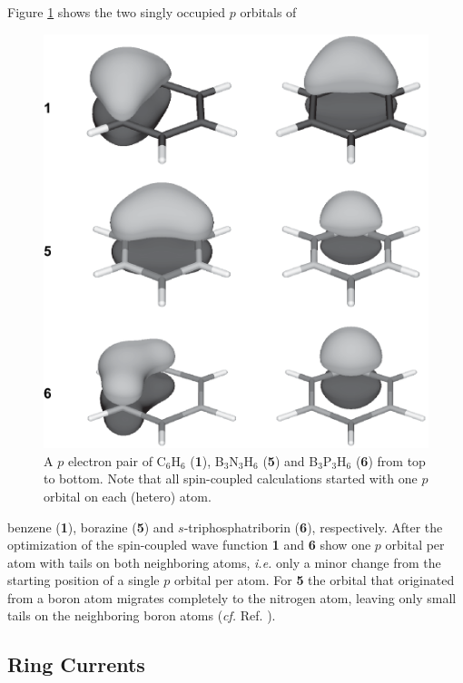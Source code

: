 Figure \ref{ch6.figure2} shows the two singly occupied $p$ orbitals of
\begin{figure}[htbp]
\center
\includegraphics[scale=0.7]{inorganic/figures/figure2.eps}
\caption{A $p$ electron pair of C$_6$H$_6$ (\textbf{1}), B$_3$N$_3$H$_6$ (\textbf{5}) and B$_3$P$_3$H$_6$ (\textbf{6})
from top to bottom. Note that all spin-coupled calculations started with one $p$ orbital on each (hetero) atom.}
\label{ch6.figure2}
\end{figure}
benzene (\textbf{1}), borazine (\textbf{5}) and $s$-triphosphatriborin (\textbf{6}),
respectively. After the optimization of the spin-coupled wave function
\textbf{1} and \textbf{6} show
one $p$ orbital per atom with tails on both neighboring atoms, \textit{i.e.}
only a minor change from the starting position of a single $p$ orbital per
atom.  For \textbf{5} the orbital that originated from a boron atom migrates
completely to the nitrogen atom, leaving only small tails on the neighboring
boron atoms (\textit{cf.} Ref.  \cite{cooper}).

\subsection{Ring Currents}

